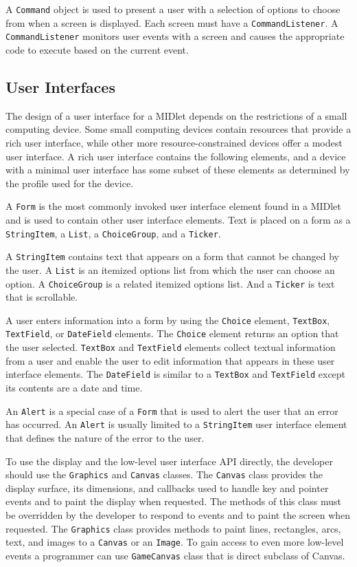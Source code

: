 A \texttt{Command} object is used to present a user with a selection of options to choose
from when a screen is displayed. Each screen must have a \texttt{CommandListener}. A \texttt{CommandListener}
monitors user events with a screen and causes the appropriate code to execute based on the current event.

\subsection{User Interfaces}

The design of a user interface for a MIDlet depends on the restrictions of a small
computing device. Some small computing devices contain resources that provide
a rich user interface, while other more resource-constrained devices offer a modest
user interface. A rich user interface contains the following elements, and a device
with a minimal user interface has some subset of these elements as determined by
the profile used for the device.

A \texttt{Form} is the most commonly invoked user interface element found in a MIDlet
and is used to contain other user interface elements. Text is placed on a form as a
\texttt{StringItem}, a \texttt{List}, a \texttt{ChoiceGroup}, and a \texttt{Ticker}.

A \texttt{StringItem} contains text that appears on a form that cannot be changed by the
user. A \texttt{List} is an itemized options list from which the user can choose an option. A
\texttt{ChoiceGroup} is a related itemized options list. And a \texttt{Ticker} is text that is scrollable.

A user enters information into a form by using the \texttt{Choice} element, \texttt{TextBox},
\texttt{TextField}, or \texttt{DateField} elements. The \texttt{Choice} element returns an option that the user
selected. \texttt{TextBox} and \texttt{TextField} elements collect textual information from a user and
enable the user to edit information that appears in these user interface elements. The
\texttt{DateField} is similar to a \texttt{TextBox} and \texttt{TextField} except its contents are a date and time.

An \texttt{Alert} is a special case of a \texttt{Form} that is used to alert the user that an error has occurred.
An \texttt{Alert} is usually limited to a \texttt{StringItem} user interface element that defines the
nature of the error to the user.

To use the display and the low-level user interface API directly, the developer should use the \texttt{Graphics}
and \texttt{Canvas} classes.
The \texttt{Canvas} class provides the display surface, its dimensions, and callbacks used to handle key and pointer events
and to paint the display when requested. The methods of this class must be overridden by the developer to respond
to events and to paint the screen when requested. The \texttt{Graphics} class provides methods to paint lines, rectangles,
arcs, text, and images to a \texttt{Canvas} or an \texttt{Image}. To gain access to even more low-level events a programmer
can use \texttt{GameCanvas} class that is direct subclass of Canvas.
